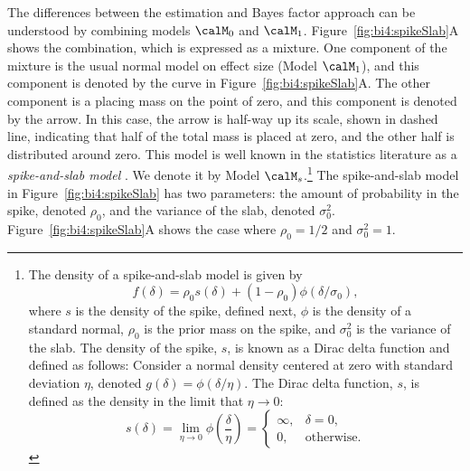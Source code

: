 The differences between the estimation and Bayes factor approach can be understood by combining models $\calM_0$ and $\calM_1$.  Figure~\ref{fig:bi4:spikeSlab}A shows the combination, which is expressed as a mixture.   One component of the mixture is the usual normal model on effect size (Model $\calM_1$), and this component is denoted by the curve in Figure~\ref{fig:bi4:spikeSlab}A.  The other component is a placing mass on the point of zero, and this component is denoted by the arrow.  In this case, the arrow is half-way up its scale, shown in dashed line, indicating that half of the total mass is placed at zero, and the other half is distributed around zero.  This model is well known in the statistics literature as a {\em spike-and-slab model} \cite{Mitchell:Beauchamp:1988}.  We denote it by Model $\calM_s$.\footnote{The density of a spike-and-slab model is given by 
\[
f(\delta) = \rho_0 s(\delta) + (1-\rho_0)\phi(\delta/\sigma_0),
\]
where $s$ is the density of the spike, defined next, $\phi$ is the density of a standard normal, $\rho_0$ is the prior mass on the spike, and $\sigma_0^2$ is the variance of the slab.   The density of the spike, $s$, is known as a Dirac delta function and defined as follows: Consider a normal density centered at zero with standard deviation $\eta$, denoted $g(\delta) = \phi (\delta/ \eta)$.   The Dirac delta function, $s$, is defined as the density in the limit that $\eta \rightarrow 0$:
\[
s(\delta) = \lim_{\eta \rightarrow 0} \phi \left( \frac{\delta}{\eta}\right) =
\left\{ \begin{array}{cc} \infty, & \delta=0,\\
0, & \mbox{otherwise.} \end{array} \right.
\]
}
The spike-and-slab model in Figure~\ref{fig:bi4:spikeSlab} has two parameters: the amount of probability in the spike, denoted $\rho_0$, and the variance of the slab, denoted $\sigma^2_0$.  Figure~\ref{fig:bi4:spikeSlab}A shows the case where $\rho_0=1/2$ and $\sigma_0^2=1$.  

